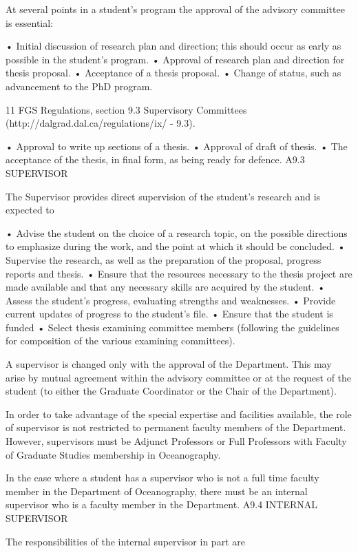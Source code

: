 At several points in a student's program the approval of the advisory committee is essential:

•	Initial discussion of research plan and direction; this should occur as early as possible in the student's program.
•	Approval of research plan and direction for thesis proposal.
•	Acceptance of a thesis proposal.
•	Change of status, such as advancement to the PhD program.

11 FGS Regulations, section 9.3 Supervisory Committees (http://dalgrad.dal.ca/regulations/ix/ - 9.3).
 

•	Approval to write up sections of a thesis.
•	Approval of draft of thesis.
•	The acceptance of the thesis, in final form, as being ready for defence.
A9.3	SUPERVISOR

The Supervisor provides direct supervision of the student's research and is expected to

•	Advise the student on the choice of a research topic, on the possible directions to emphasize during the work, and the point at which it should be concluded.
•	Supervise the research, as well as the preparation of the proposal, progress reports and thesis.
•	Ensure that the resources necessary to the thesis project are made available and that any necessary skills are acquired by the student.
•	Assess the student's progress, evaluating strengths and weaknesses.
•	Provide current updates of progress to the student's file.
•	Ensure that the student is funded
•	Select thesis examining committee members (following the guidelines for composition of the various examining committees).

A supervisor is changed only with the approval of the Department. This may arise by mutual agreement within the advisory committee or at the request of the student (to either the Graduate Coordinator or the Chair of the Department).

In order to take advantage of the special expertise and facilities available, the role of supervisor is not restricted to permanent faculty members of the Department. However, supervisors must be Adjunct Professors or Full Professors with Faculty of Graduate Studies membership in Oceanography.

In the case where a student has a supervisor who is not a full time faculty member in the Department of Oceanography, there must be an internal supervisor who is a faculty member in the Department.
A9.4	INTERNAL SUPERVISOR

The responsibilities of the internal supervisor in part are

